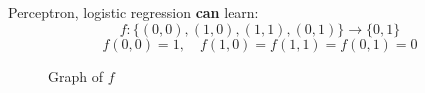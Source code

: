 \documentclass{beamer}
\begin{document}
\begin{frame}{}
    Perceptron, logistic regression \textbf{can} learn:
    \[
        f:\big\{(0, 0), (1, 0), (1, 1), (0, 1)\big\}\longrightarrow
        \{0,1\}
    \]
    \[
        f(0, 0) =  1,\quad f(1, 0) = f(1, 1) = f(0, 1) = 0
    \]

    \begin{figure}
        \caption{Graph of $f$}
    \end{figure}
\end{frame}
\end{document}

